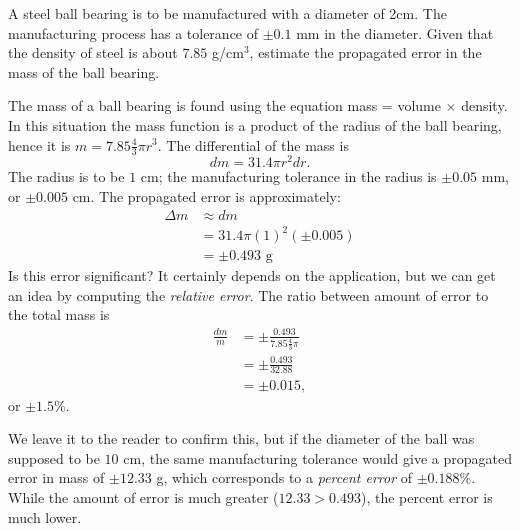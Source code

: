 \begin{example} \label{Ex:3.6.Eg4}
A steel ball bearing is to be manufactured with a diameter of 2cm. The manufacturing process has a tolerance of $\pm 0.1$ mm in the diameter. Given that the density of steel is about $7.85$ g/cm$^3$, estimate the propagated error in the mass of the ball bearing.

\solution The mass of a ball bearing is found using the equation mass = volume $\times$ density. In this situation the mass function is a product of the radius of the ball bearing, hence it is $m = 7.85\frac43\pi r^3$. The differential of the mass is $$dm = 31.4\pi r^2 dr.$$ The radius is to be $1$ cm; the manufacturing tolerance in the radius is $\pm 0.05$ mm, or $\pm 0.005$ cm. The propagated error is approximately:
\begin{align*}
\Delta m & \approx dm \\
&= 31.4\pi (1)^2 (\pm 0.005) \\
&= \pm 0.493\text{ g}
\end{align*}
Is this error significant? It certainly depends on the application, but we can get an idea by computing the \textit{relative error}. The ratio between amount of error to the total mass is
\begin{align*}
\frac{dm}{m} &= \pm \frac{0.493}{7.85\frac43\pi} \\
&=\pm \frac{0.493}{32.88}\\
&=\pm 0.015,
\end{align*}
or $\pm 1.5$\%. 

We leave it to the reader to confirm this, but if the diameter of the ball was supposed to be $10$ cm, the same manufacturing tolerance would give a propagated error in mass of $\pm12.33$ g, which corresponds to a \textit{percent error} of $\pm0.188$\%. While the amount of error is much greater ($12.33 > 0.493$), the percent error is much lower.
\end{example}
